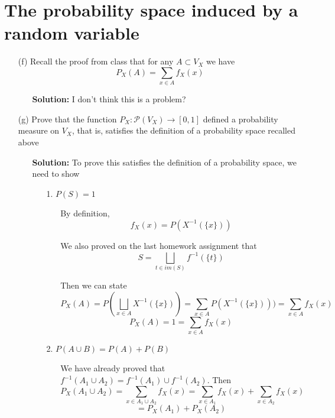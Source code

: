 \documentclass[hidelinks]{article}
\begin{document}
\section{The probability space induced by a random variable}
\begin{itemize}
    \item[(f)] Recall the proof from class that for any $A \subset V_X$ we have $$P_X(A) = \sum_{x \in A} f_X(x)$$ 
   \begin{itemize}
       \item[ ] \textbf{Solution:} I don't think this is a problem?
   \end{itemize}
    \item[(g)] Prove that the function $P_X: \mathcal{P}(V_X) \rightarrow [0, 1]$ defined a probability measure on $V_X$, that is, satisfies the definition of a probability space recalled above 
   \begin{itemize}
       \item[ ] \textbf{Solution:} To prove this satisfies the definition of a probability space, we need to show 
       \begin{itemize}
            \item[1.] $P(S) = 1$
            \begin{itemize}
                \item[ ] By definition,  
                \[
                    f_X(x) = P(X^{-1}(\{x\})) 
                \]
                \item[ ] We also proved on the last homework assignment that 
                \[
                    S = \bigsqcup_{t \in im(S)} f^{-1}(\{t\})
                \]
            \item[ ] Then we can state 
                \[
                    P_X(A) = P(\bigsqcup_{x \in A} X^{-1}(\{x\})) = \sum_{x \in A} P(X^{-1}(\{x\})))= \sum_{x \in A} f_X(x)
                \]
                \[
                P_X(A)  =  1 = \sum_{x \in A} f_X(x)
                \]
            \end{itemize}
            \item[2.] $P(A \cup B) = P(A) + P(B)$
           \begin{itemize}
               \item[ ] We have already proved that $f^{-1}(A_1 \cup A_2) = f^{-1}(A_1) \cup f^{-1}(A_2)$. Then 
                \[
                    P_X(A_1 \cup A_2) =  \sum_{x \in A_1 \cup A_2} f_X(x) =  \sum_{x \in A_1} f_X(x) +  \sum_{x \in A_2} f_X(x)
                \]
                \[
                    = P_X(A_1) + P_X(A_2)
\]
\end{itemize}
\end{itemize}
\end{itemize}
\end{itemize}
\end{document}
